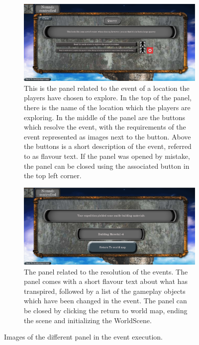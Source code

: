 \begin{figure}[!ht]
    \centering
    \begin{subfigure}[b]{\textwidth}
        \includegraphics[width=\textwidth]{Images/EventPanel.png}
        \caption{This is the panel related to the event of a location the players have chosen to explore. In the top of the panel, there is the name of the location which the players are exploring.
       In the middle of the panel are the buttons which resolve the event, with the requirements of the event represented as images next to the button.
        Above the buttons is a short description of the event, referred to as flavour text. If the panel was opened by mistake, the panel can be closed using the associated button in the top left corner. }
        \label{fig:evepan}
    \end{subfigure}
    \begin{subfigure}[b]{\textwidth}
        \includegraphics[width=\textwidth]{Images/EventResolution.png}
        \caption{The panel related to the resolution of the events. The panel comes with a short flavour text about what has transpired, followed by a list of the gameplay objects which have been changed in the event. The panel can be closed by clicking the return to world map, ending the scene and initializing the WorldScene.}
        \label{fig:everes}
    \end{subfigure}
    \caption{Images of the different panel in the event execution.}
    \label{fig:eventPans}
\end{figure}

